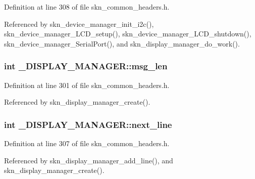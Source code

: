 Definition at line 308 of file skn\+\_\+common\+\_\+headers.\+h.



Referenced by skn\+\_\+device\+\_\+manager\+\_\+init\+\_\+i2c(), skn\+\_\+device\+\_\+manager\+\_\+\+L\+C\+D\+\_\+setup(), skn\+\_\+device\+\_\+manager\+\_\+\+L\+C\+D\+\_\+shutdown(), skn\+\_\+device\+\_\+manager\+\_\+\+Serial\+Port(), and skn\+\_\+display\+\_\+manager\+\_\+do\+\_\+work().

\hypertarget{struct___d_i_s_p_l_a_y___m_a_n_a_g_e_r_a10067d9a5974f5f19bf638ee72ddd973}{
\subsubsection[{msg\+\_\+len}]{\setlength{\rightskip}{0pt plus 5cm}int \+\_\+\+D\+I\+S\+P\+L\+A\+Y\+\_\+\+M\+A\+N\+A\+G\+E\+R\+::msg\+\_\+len}}\label{struct___d_i_s_p_l_a_y___m_a_n_a_g_e_r_a10067d9a5974f5f19bf638ee72ddd973}


Definition at line 301 of file skn\+\_\+common\+\_\+headers.\+h.



Referenced by skn\+\_\+display\+\_\+manager\+\_\+create().

\hypertarget{struct___d_i_s_p_l_a_y___m_a_n_a_g_e_r_aed299ac3603bba3dfe3c09389122f8d8}{
\subsubsection[{next\+\_\+line}]{\setlength{\rightskip}{0pt plus 5cm}int \+\_\+\+D\+I\+S\+P\+L\+A\+Y\+\_\+\+M\+A\+N\+A\+G\+E\+R\+::next\+\_\+line}}\label{struct___d_i_s_p_l_a_y___m_a_n_a_g_e_r_aed299ac3603bba3dfe3c09389122f8d8}


Definition at line 307 of file skn\+\_\+common\+\_\+headers.\+h.



Referenced by skn\+\_\+display\+\_\+manager\+\_\+add\+\_\+line(), and skn\+\_\+display\+\_\+manager\+\_\+create().

